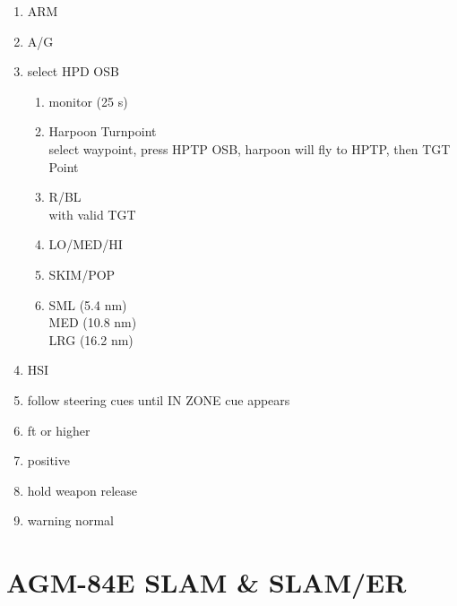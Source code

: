 \documentclass[fontInter, widesubsec]{TechCheck}
\begin{document}
	\begin{enumerate}
		\item {}\dotfill ARM
		\item {}\dotfill A/G
		\item {}\dotfill select HPD OSB
		\begin{enumerate}
			\item {}\dotfill monitor (25 s)
			\item {}\dotfill Harpoon Turnpoint \\ select waypoint, press HPTP OSB, harpoon will fly to HPTP, then TGT Point
			\item {}\dotfill R/BL \\ with valid TGT
			\item {}\dotfill LO/MED/HI
			\item {}\dotfill SKIM/POP
			\item {}\dotfill SML (5.4 nm) \\ \hfill MED (10.8 nm) \\ \hfill LRG (16.2 nm)
		\end{enumerate}
		\item {}\dotfill HSI
		\item {}\dotfill follow steering cues until IN ZONE cue appears
		\item {} ft or higher
		\item {}\dotfill positive
		\item {}\dotfill hold weapon release
		\item {}\dotfill warning normal
	\end{enumerate}

	\thumbnar

	\section{AGM-84E SLAM \& SLAM/ER}
\end{document}
